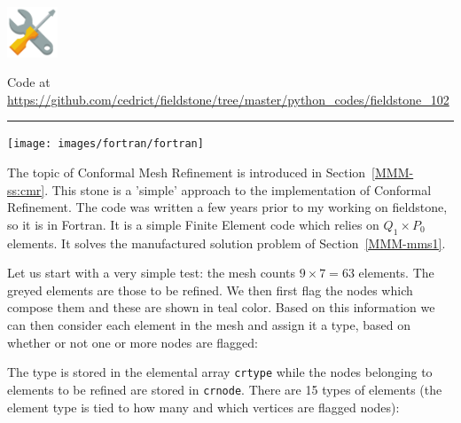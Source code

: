 \includegraphics[height=1.5cm]{images/pictograms/tools}




\begin{center}
Code at \url{https://github.com/cedrict/fieldstone/tree/master/python_codes/fieldstone_102}
\end{center}

\par\noindent\rule{\textwidth}{0.4pt}



\begin{center}
\texttt{[image: images/fortran/fortran]} 
\end{center}

The topic of Conformal Mesh Refinement is introduced in Section~\ref{MMM-ss:cmr}.
This stone is a 'simple' approach to the implementation of Conformal Refinement. The code was written 
a few years prior to my working on fieldstone, so it is in Fortran. It is a 
simple Finite Element code which relies on $Q_1\times P_0$ elements. It solves the 
manufactured solution problem of Section~\ref{MMM-mms1}.

Let us start with a very simple test: the mesh counts $9\times 7=63$ elements.
The greyed elements are those to be refined. We then first flag 
the nodes which compose them and these are shown in teal color.
Based on this information we can then consider each element in the mesh and assign it a type, 
based on whether or not one or more nodes are flagged: 

\begin{center}

\end{center}

The type is stored in the elemental array {\tt crtype} while the nodes belonging to elements 
to be refined are stored in {\tt crnode}.
There are 15 types of elements (the element type is tied to how many and which vertices are flagged nodes):

\begin{center}

\end{center}

